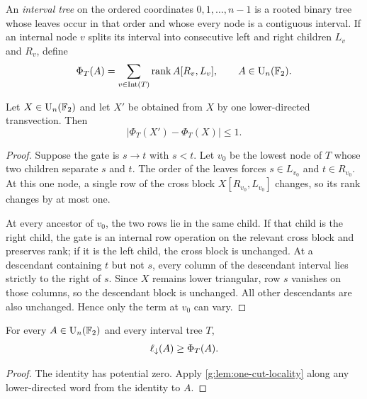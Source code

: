 \begin{definition}
An \emph{interval tree} on the ordered coordinates $0,1,\ldots,n-1$ is a rooted binary tree whose leaves occur in that order and whose every node is a contiguous interval.  If an internal node $v$ splits its interval into consecutive left and right children $L_v$ and $R_v$, define
\begin{equation}\label{g:eq:tree-potential}
\Phi_T(A)
=
\sum_{v\in\operatorname{Int}(T)}
\operatorname{rank} A[R_v,L_v],
\qquad A\in\operatorname{U}_n(\mathbb F_2).
\end{equation}
\end{definition}

\begin{lemma}\label{g:lem:one-cut-locality}
Let $X\in\operatorname{U}_n(\mathbb F_2)$ and let $X'$ be obtained from $X$ by one lower-directed transvection.  Then
\[
\bigl|\Phi_T(X')-\Phi_T(X)\bigr|\le1.
\]
\end{lemma}

\begin{proof}
Suppose the gate is $s\to t$ with $s<t$.  Let $v_0$ be the lowest node of $T$ whose two children separate $s$ and $t$.  The order of the leaves forces $s\in L_{v_0}$ and $t\in R_{v_0}$.  At this one node, a single row of the cross block $X[R_{v_0},L_{v_0}]$ changes, so its rank changes by at most one.

At every ancestor of $v_0$, the two rows lie in the same child.  If that child is the right child, the gate is an internal row operation on the relevant cross block and preserves rank; if it is the left child, the cross block is unchanged.  At a descendant containing $t$ but not $s$, every column of the descendant interval lies strictly to the right of $s$.  Since $X$ remains lower triangular, row $s$ vanishes on those columns, so the descendant block is unchanged.  All other descendants are also unchanged.  Hence only the term at $v_0$ can vary.
\end{proof}

\begin{corollary}\label{g:cor:tree-lower-bound}
For every $A\in\operatorname{U}_n(\mathbb F_2)$ and every interval tree $T$,
\[
\ell_{\downarrow}(A)\ge\Phi_T(A).
\]
\end{corollary}

\begin{proof}
The identity has potential zero.  Apply \cref{g:lem:one-cut-locality} along any lower-directed word from the identity to $A$.
\end{proof}

